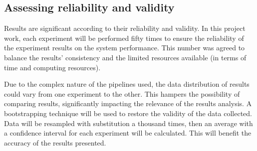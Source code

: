 \subsection{Assessing reliability and validity}
\label{subsec:reliability_validity}

Results are significant according to their reliability and validity. In this project work, each experiment will be performed fifty times to ensure the reliability of the experiment results on the system performance. This number was agreed to balance the results' consistency and the limited resources available (in terms of time and computing resources).

Due to the complex nature of the pipelines used, the data distribution of results could vary from one experiment to the other. This hampers the possibility of comparing results, significantly impacting the relevance of the results analysis. A bootstrapping technique will be used to restore the validity of the data collected. Data will be resampled with substitution a thousand times, then an average with a confidence interval for each experiment will be calculated. This will benefit the accuracy of the results presented.